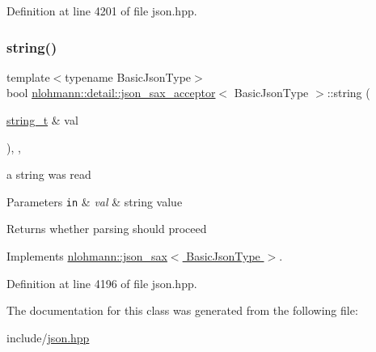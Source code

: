 Definition at line 4201 of file json.\+hpp.

\mbox{\label{classnlohmann_1_1detail_1_1json__sax__acceptor_a72e61155545d43bb829c9a9211978300}} 
\subsubsection{\texorpdfstring{string()}{string()}}
{\footnotesize\ttfamily template$<$typename Basic\+Json\+Type$>$ \\
bool \hyperlink{classnlohmann_1_1detail_1_1json__sax__acceptor}{nlohmann\+::detail\+::json\+\_\+sax\+\_\+acceptor}$<$ Basic\+Json\+Type $>$\+::string (\begin{DoxyParamCaption}\item[{\hyperlink{structnlohmann_1_1json__sax_ae01977a9f3c5b3667b7a2929ed91061e}{string\+\_\+t} \&}]{val }\end{DoxyParamCaption})\hspace{0.3cm}{\ttfamily [inline]}, {\ttfamily [override]}, {\ttfamily [virtual]}}



a string was read 


\begin{DoxyParams}[1]{Parameters}
\mbox{\tt in}  & {\em val} & string value \\
\hline
\end{DoxyParams}
\begin{DoxyReturn}{Returns}
whether parsing should proceed 
\end{DoxyReturn}


Implements \hyperlink{structnlohmann_1_1json__sax_a07eab82f6c82d606787eee9ad73d2bda}{nlohmann\+::json\+\_\+sax$<$ Basic\+Json\+Type $>$}.



Definition at line 4196 of file json.\+hpp.



The documentation for this class was generated from the following file\+:\begin{DoxyCompactItemize}
\item 
include/\hyperlink{json_8hpp}{json.\+hpp}\end{DoxyCompactItemize}
